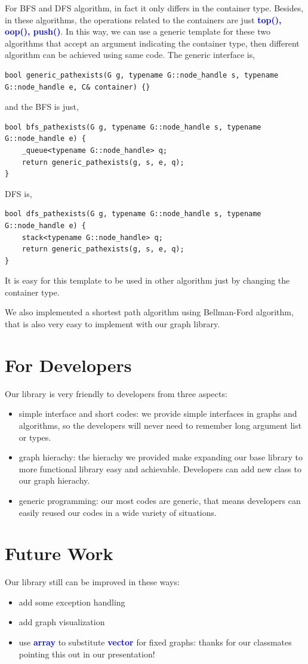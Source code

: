 \documentclass[]{article}
\begin{document}
For BFS and DFS algorithm, in fact it only differs in the container type. Besides, in these algorithms, the operations related to the containers are just \textbf{\textcolor{blue}{top(), oop(), push()}}. In this way, we can use a generic template for these two algorithms that accept an argument indicating the container type, then different algorithm can be achieved using same code.
The generic interface is,
\begin{lstlisting}
bool generic_pathexists(G g, typename G::node_handle s, typename 
G::node_handle e, C& container) {}

\end{lstlisting} 
and the BFS is just,
\begin{lstlisting}
bool bfs_pathexists(G g, typename G::node_handle s, typename 
G::node_handle e) {
    _queue<typename G::node_handle> q;
    return generic_pathexists(g, s, e, q);
}
\end{lstlisting}
DFS is,
\begin{lstlisting}
bool dfs_pathexists(G g, typename G::node_handle s, typename 
G::node_handle e) {
    stack<typename G::node_handle> q;
    return generic_pathexists(g, s, e, q);
}
\end{lstlisting}
It is easy for this template to be used in other algorithm just by changing the container type. 

We also implemented a shortest path algorithm using Bellman-Ford algorithm, that is also very easy to implement with our graph library.


\section{For Developers}
Our library is very friendly to developers from three aspects:
\begin{itemize}
	\item simple interface and short codes: we provide simple interfaces in graphs and algorithms, so the developers will never need to remember long argument list or types.
	\item graph hierachy: the hierachy we provided make expanding our base library to more functional library easy and achievable. Developers can add new class to our graph hierachy.
	\item generic programming: our most codes are generic, that means developers can easily reused our codes in a wide variety of situations.
	\end{itemize}

\section {Future Work}
Our library still can be improved in these ways:
\begin{itemize}
	\item add some exception handling
	\item add graph visualization
	\item use \textbf{\textcolor{blue}{array}} to substitute \textbf{\textcolor{blue}{vector}} for fixed graphs: thanks for our classmates pointing this out in our presentation!
	\end{itemize}
\end{document}
